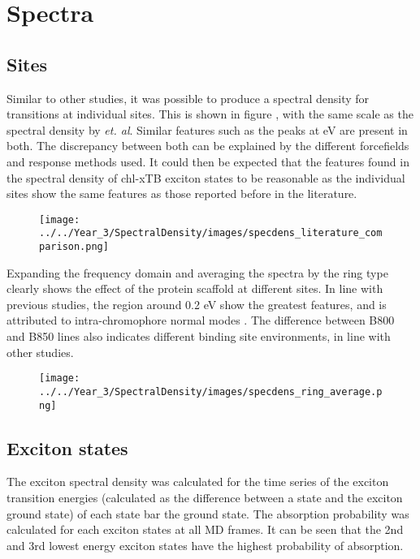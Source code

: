 \section{Spectra}
\label{sec:sites_states_couplings}

\subsection{Sites}
\label{subsec:sites}

Similar to other studies, it was possible to produce a spectral density for \Qy 
transitions at individual sites. This is shown in figure , with the same scale as
the spectral density by \emph{et. al}. Similar features such as the peaks at eV
are present in both. The discrepancy between both can be explained by the different
forcefields and response methods used. It could then be expected that the features 
found in the spectral density of chl-xTB exciton states to be reasonable as the 
individual sites show the same features as those reported before in the literature.

\begin{figure}
    \centering
    \texttt{[image: ../../Year\_3/SpectralDensity/images/specdens\_literature\_comparison.png]}
\end{figure}

Expanding the frequency domain and averaging the spectra by the ring type clearly
shows the effect of the protein scaffold at different sites. In line with previous
studies, the region around 0.2 eV show the greatest features, and is attributed
to intra-chromophore normal modes \cite{Olbrich2010}. The difference between B800
and B850 lines also indicates different binding site environments, in line with 
other studies.

\begin{figure}
    \centering
    \texttt{[image: ../../Year\_3/SpectralDensity/images/specdens\_ring\_average.png]}
\end{figure}

\afterpartskip
\subsection{Exciton states}
\label{subsec:states}

The exciton spectral density was calculated for the time series of the exciton transition
energies (calculated as the difference between a state and the exciton ground state)
of each state bar the ground state. The absorption probability was calculated for
each exciton states at all MD frames. It can be seen that the 2nd and 3rd lowest 
energy exciton states have the highest probability of absorption. 

